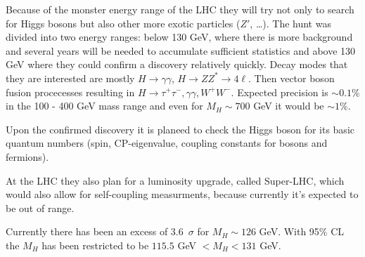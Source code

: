 Because of the monster energy range of the LHC they will try not only to search for Higgs bosons but also other more exotic
particles ($Z'$, \ldots). The hunt was divided into two energy ranges: below 130 GeV, where there is more background and several years
will be needed to accumulate sufficient statistics and above 130 GeV where they could confirm a discovery relatively quickly. Decay
modes that they are interested are mostly $H \to \gamma\gamma$, $H \to ZZ^* \to 4\ell$. Then vector boson fusion procecesses
resulting in $H \to \tau^+\tau^-, \gamma\gamma, W^+W^-$. Expected precision is $\sim 0.1\%$ in the 100 - 400 GeV mass range and
even for $M_H \sim 700$ GeV it would be $\sim 1\%$.

\vspace{12pt}

Upon the confirmed discovery it is planeed to check the Higgs boson for its basic quantum numbers (spin, CP-eigenvalue, coupling
constants for bosons and fermions).

At the LHC they also plan for a luminosity upgrade, called Super-LHC, which would also
allow for self-coupling measurments, because currently it's expected to be out of range.

Currently there has been an excess of 3.6~$\sigma$ for $M_H \sim 126$ GeV. With 95\% CL the $M_H$ has been restricted to be
$115.5$ GeV $< M_H < 131$ GeV.
